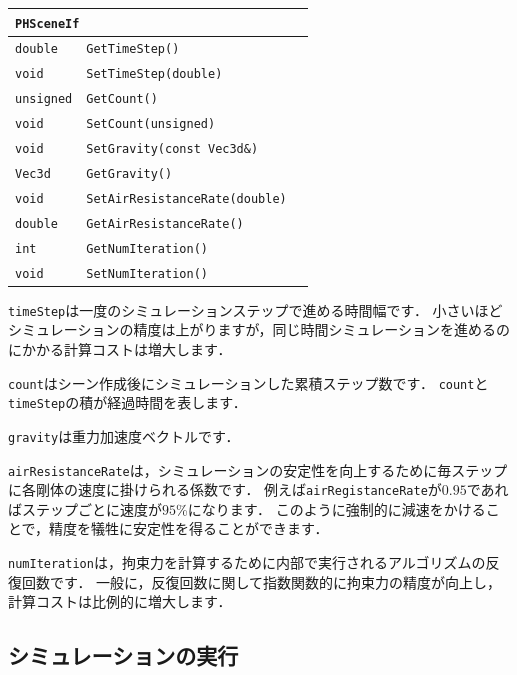 \begin{center}
\begin{tabular}{p{.15\hsize}p{.55\hsize}p{.2\hsize}}
\multicolumn{3}{l}{\texttt{PHSceneIf}}							  \\ \midrule
\texttt{double}		& \texttt{GetTimeStep()}					& \\
\texttt{void}		& \texttt{SetTimeStep(double)}				& \\
\texttt{unsigned}	& \texttt{GetCount()}						& \\
\texttt{void}		& \texttt{SetCount(unsigned)}				& \\
\texttt{void}		& \texttt{SetGravity(const Vec3d\&)}		& \\
\texttt{Vec3d}		& \texttt{GetGravity()}						& \\
\texttt{void}		& \texttt{SetAirResistanceRate(double)}		& \\
\texttt{double}		& \texttt{GetAirResistanceRate()}			& \\
\texttt{int}		& \texttt{GetNumIteration()}				& \\
\texttt{void}		& \texttt{SetNumIteration()}				& \\
\end{tabular}
\end{center}

\texttt{timeStep}\KLUDGE は一度のシミュレーションステップで進める時間幅です．
\KLUDGE 小さいほどシミュレーションの精度は上がりますが，同じ時間シミュレーションを進めるのにかかる計算コストは増大します．

\texttt{count}\KLUDGE はシーン作成後にシミュレーションした累積ステップ数です．
\texttt{count}\KLUDGE と\texttt{timeStep}\KLUDGE の積が経過時間を表します．

\texttt{gravity}\KLUDGE は重力加速度ベクトルです．

\texttt{airResistanceRate}\KLUDGE は，シミュレーションの安定性を向上するために毎ステップに各剛体の速度に掛けられる係数です．
\KLUDGE 例えば\texttt{airRegistanceRate}\KLUDGE が$0.95$\KLUDGE であればステップごとに速度が$95$\%\KLUDGE になります．
\KLUDGE このように強制的に減速をかけることで，精度を犠牲に安定性を得ることができます．

\texttt{numIteration}\KLUDGE は，拘束力を計算するために内部で実行されるアルゴリズムの反復回数です．
\KLUDGE 一般に，反復回数に関して指数関数的に拘束力の精度が向上し，計算コストは比例的に増大します．

\subsection*{\KLUDGE シミュレーションの実行}

